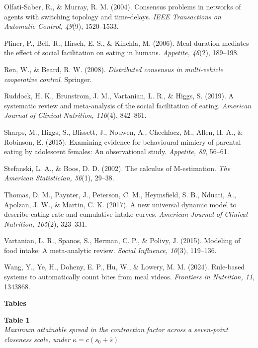 \documentclass[12pt]{article}
\begin{document}
Olfati-Saber, R., \& Murray, R. M. (2004). Consensus problems in networks of agents with switching topology and time-delays. \emph{IEEE Transactions on Automatic Control, 49}(9), 1520--1533.

Pliner, P., Bell, R., Hirsch, E. S., \& Kinchla, M. (2006). Meal duration mediates the effect of social facilitation on eating in humans. \emph{Appetite, 46}(2), 189--198.

Ren, W., \& Beard, R. W. (2008). \emph{Distributed consensus in multi-vehicle cooperative control}. Springer.

Ruddock, H. K., Brunstrom, J. M., Vartanian, L. R., \& Higgs, S. (2019). A systematic review and meta-analysis of the social facilitation of eating. \emph{American Journal of Clinical Nutrition, 110}(4), 842--861.

Sharps, M., Higgs, S., Blissett, J., Nouwen, A., Chechlacz, M., Allen, H. A., \& Robinson, E. (2015). Examining evidence for behavioural mimicry of parental eating by adolescent females: An observational study. \emph{Appetite, 89}, 56--61.

Stefanski, L. A., \& Boos, D. D. (2002). The calculus of M-estimation. \emph{The American Statistician, 56}(1), 29--38.

Thomas, D. M., Paynter, J., Peterson, C. M., Heymsfield, S. B., Nduati, A., Apolzan, J. W., \& Martin, C. K. (2017). A new universal dynamic model to describe eating rate and cumulative intake curves. \emph{American Journal of Clinical Nutrition, 105}(2), 323--331.

Vartanian, L. R., Spanos, S., Herman, C. P., \& Polivy, J. (2015). Modeling of food intake: A meta-analytic review. \emph{Social Influence, 10}(3), 119--136.

Wang, Y., Ye, H., Doheny, E. P., Hu, W., \& Lowery, M. M. (2024). Rule-based systems to automatically count bites from meal videos. \emph{Frontiers in Nutrition, 11}, 1343868.

\endgroup

\newpage

\begin{center}\textbf{Tables}\end{center}

\vspace{0.2in}

\noindent\textbf{Table 1}\\
\emph{Maximum attainable spread in the contraction factor across a seven-point
closeness scale, under $\kappa=c(s_0+\bar s)$}
\end{document}

